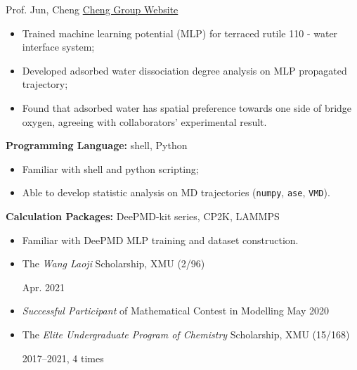 \vspace{5mm}



{\noindent Prof. Jun, Cheng  \hfill \href{https://chengjun.xmu.edu.cn/}{Cheng Group Website}}


\begin{itemize}
\item Trained machine learning potential (MLP) for terraced rutile 110 - water interface system;
\item Developed adsorbed water dissociation degree analysis on MLP propagated trajectory;
\item Found that adsorbed water has spatial preference towards one side of bridge oxygen, agreeing with collaborators' experimental result.
\end{itemize}


\vspace{5mm}

\sectionrule
{\noindent \textbf{Programming Language:} }{shell, Python}
\begin{itemize}
\item Familiar with shell and python scripting; 
\item Able to develop statistic analysis on MD trajectories (\texttt{numpy}, \texttt{ase}, \texttt{VMD}). 
\end{itemize}

{\noindent \textbf{Calculation Packages:} }{DeePMD-kit series, CP2K, LAMMPS}

\begin{itemize}
\item Familiar with DeePMD MLP training and dataset construction.
\end{itemize}

\vspace{5mm}
\sectionrule

\begin{itemize}
\item The \emph{Wang Laoji} Scholarship, XMU (2/96)

\hfill Apr. 2021
\item \emph{Successful Participant} of Mathematical Contest in Modelling \hfill May 2020
\item The \emph{Elite Undergraduate Program of Chemistry} Scholarship, XMU (15/168)

\hspace*{\fill}2017--2021, 4 times
\end{itemize}
